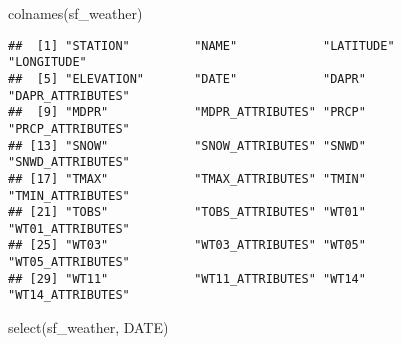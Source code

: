 \documentclass[
]{article}
\newenvironment{Shaded}{\begin{snugshade}}{\end{snugshade}}
\newcommand{\FunctionTok}[1]{\textcolor[rgb]{0.00,0.00,0.00}{#1}}
\newcommand{\NormalTok}[1]{#1}
\begin{document}
\begin{Shaded}
\begin{Highlighting}[]
\FunctionTok{colnames}\NormalTok{(sf\_weather)}
\end{Highlighting}
\end{Shaded}

\begin{verbatim}
##  [1] "STATION"         "NAME"            "LATITUDE"        "LONGITUDE"      
##  [5] "ELEVATION"       "DATE"            "DAPR"            "DAPR_ATTRIBUTES"
##  [9] "MDPR"            "MDPR_ATTRIBUTES" "PRCP"            "PRCP_ATTRIBUTES"
## [13] "SNOW"            "SNOW_ATTRIBUTES" "SNWD"            "SNWD_ATTRIBUTES"
## [17] "TMAX"            "TMAX_ATTRIBUTES" "TMIN"            "TMIN_ATTRIBUTES"
## [21] "TOBS"            "TOBS_ATTRIBUTES" "WT01"            "WT01_ATTRIBUTES"
## [25] "WT03"            "WT03_ATTRIBUTES" "WT05"            "WT05_ATTRIBUTES"
## [29] "WT11"            "WT11_ATTRIBUTES" "WT14"            "WT14_ATTRIBUTES"
\end{verbatim}

\begin{Shaded}
\begin{Highlighting}[]
\FunctionTok{select}\NormalTok{(sf\_weather, DATE)}
\end{Highlighting}
\end{Shaded}
\end{document}
